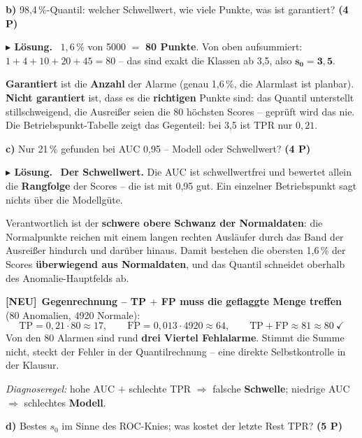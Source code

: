 \documentclass[10pt,a4paper]{article}
\newcommand{\pkt}[1]{\hfill\textbf{(#1 P)}}
\newcommand{\neu}{{\color{neurot}\footnotesize\bfseries[NEU]}\ }
\newenvironment{loes}%
  {\par\vspace{2pt}\begingroup\small\noindent\textbf{\color{loesfarbe}$\blacktriangleright$ Lösung.}\ }%
  {\endgroup\par\vspace{5pt}}
\begin{document}
\textbf{b)} 98,4\,\%-Quantil: welcher Schwellwert, wie viele Punkte, was ist garantiert? \pkt{4}

\begin{loes}
$1{,}6\,\%$ von 5000 $=$ \textbf{80 Punkte}. Von oben aufsummiert: $1+4+10+20+45 = 80$ -- das sind
exakt die Klassen ab 3,5, also $\mathbf{s_0 = 3{,}5}$.

\textbf{Garantiert} ist die \textbf{Anzahl} der Alarme (genau 1,6\,\%, die Alarmlast ist planbar).
\textbf{Nicht garantiert} ist, dass es die \textbf{richtigen} Punkte sind: das Quantil unterstellt
stillschweigend, die Ausreißer seien die 80 höchsten Scores -- geprüft wird das nie. Die
Betriebspunkt-Tabelle zeigt das Gegenteil: bei 3,5 ist TPR nur $0{,}21$.
\end{loes}

\textbf{c)} Nur 21\,\% gefunden bei AUC 0,95 -- Modell oder Schwellwert? \pkt{4}

\begin{loes}
\textbf{Der Schwellwert.} Die AUC ist schwellwertfrei und bewertet allein die \textbf{Rangfolge}
der Scores -- die ist mit 0,95 gut. Ein einzelner Betriebspunkt sagt nichts über die Modellgüte.

Verantwortlich ist der \textbf{schwere obere Schwanz der Normaldaten}: die Normalpunkte reichen mit
einem langen rechten Ausläufer durch das Band der Ausreißer hindurch und darüber hinaus. Damit
bestehen die obersten 1,6\,\% der Scores \textbf{überwiegend aus Normaldaten}, und das Quantil
schneidet oberhalb des Anomalie-Hauptfelds ab.

\neu \textbf{Gegenrechnung -- TP $+$ FP muss die geflaggte Menge treffen} (80 Anomalien,
4920 Normale):
\[
\text{TP} = 0{,}21\cdot80 \approx 17,\qquad
\text{FP} = 0{,}013\cdot4920 \approx 64,\qquad
\text{TP}+\text{FP} \approx 81 \approx 80 \ \checkmark
\]
Von den 80 Alarmen sind rund \textbf{drei Viertel Fehlalarme}. Stimmt die Summe nicht, steckt der
Fehler in der Quantilrechnung -- eine direkte Selbstkontrolle in der Klausur.

\emph{Diagnoseregel:} hohe AUC $+$ schlechte TPR $\Rightarrow$ falsche \textbf{Schwelle};
niedrige AUC $\Rightarrow$ schlechtes \textbf{Modell}.
\end{loes}

\textbf{d)} Bestes $s_0$ im Sinne des ROC-Knies; was kostet der letzte Rest TPR? \pkt{5}
\end{document}
